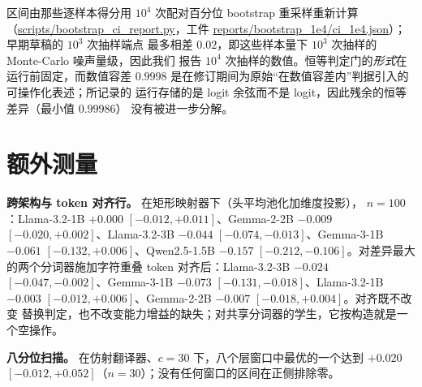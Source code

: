 \documentclass[10pt,a4paper,fontset=fandol]{ctexart}
\begin{document}
区间由那些逐样本得分用 $10^4$ 次配对百分位 bootstrap 重采样重新计算
（\url{scripts/bootstrap_ci_report.py}，工件
\url{reports/bootstrap_1e4/ci_1e4.json}）；早期草稿的 $10^3$ 次抽样端点
最多相差 $0.02$，即这些样本量下 $10^3$ 次抽样的 Monte-Carlo 噪声量级，因此我们
报告 $10^4$ 次抽样的数值。恒等判定门的\emph{形式}在运行前固定，而数值容差
$0.9998$ 是在修订期间为原始“在数值容差内”判据引入的可操作化表述；所记录的
运行存储的是 logit 余弦而不是 logit，因此残余的恒等差异（最小值 $0.99986$）
没有被进一步分解。

\begin{table}[t]
\centering
\caption{梯度训练家族：表~\ref{tab:main} 按训练范围报告的那些行的区间细节
（$10^4$ 次抽样配对 bootstrap）。每个家族每一次被记录的训练，其区间上界都低于
零，这正是其\emph{退化}方向标签所要求的。}
\label{tab:mlp-ci}
\end{table}

\section{额外测量}
\label{app:extra}

\textbf{跨架构与 token 对齐行。} 在矩形映射器下（头平均池化加维度投影），
$n{=}100$：Llama-3.2-1B $+0.000$ $[-0.012,+0.011]$、Gemma-2-2B $-0.009$
$[-0.020,+0.002]$、Llama-3.2-3B $-0.044$ $[-0.074,-0.013]$、Gemma-3-1B
$-0.061$ $[-0.132,+0.006]$、Qwen2.5-1.5B $-0.157$ $[-0.212,-0.106]$。对差异最大
的两个分词器施加字符重叠 token 对齐后：Llama-3.2-3B $-0.024$
$[-0.047,-0.002]$、Gemma-3-1B $-0.073$ $[-0.131,-0.018]$、Llama-3.2-1B
$-0.003$ $[-0.012,+0.006]$、Gemma-2-2B $-0.007$ $[-0.018,+0.004]$。对齐既不改变
替换判定，也不改变能力增益的缺失；对共享分词器的学生，它按构造就是一个空操作。

\textbf{八分位扫描。} 在仿射翻译器、$c{=}30$ 下，八个层窗口中最优的一个达到
$+0.020$ $[-0.012,+0.052]$（$n{=}30$）；没有任何窗口的区间在正侧排除零。
\end{document}
